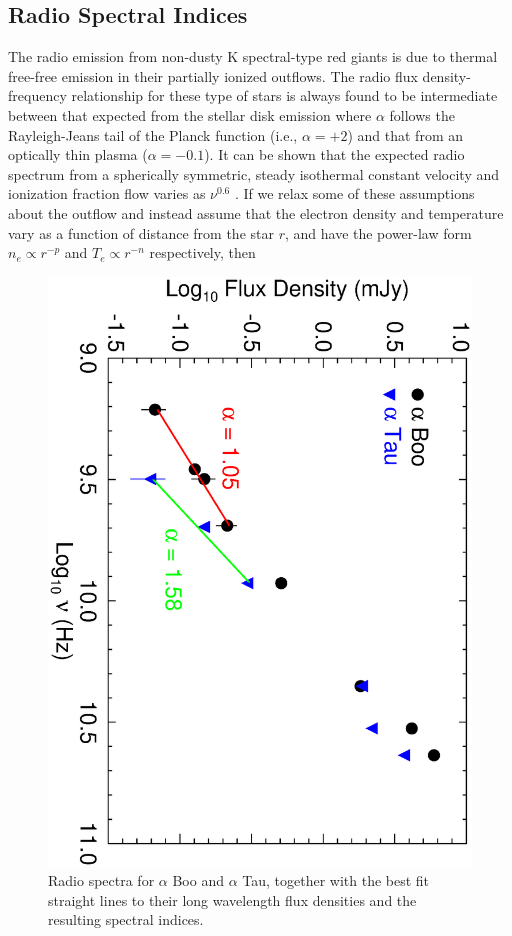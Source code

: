 \documentclass[iop]{emulateapj}
\begin{document}
\subsection{Radio Spectral Indices} \label{disc:disc3}
The radio emission from non-dusty K spectral-type red giants is due to thermal free-free emission in their partially ionized outflows. The radio flux density-frequency relationship for these type of stars is always found to be intermediate between that expected from the stellar disk emission where $\alpha$ follows the Rayleigh-Jeans tail of the Planck function (i.e., $\alpha = +2$) and that from an optically thin plasma ($\alpha = -0.1$). It can be shown that the expected radio spectrum from a spherically symmetric, steady isothermal constant velocity and ionization fraction flow varies as $\nu ^{0.6}$ \citep{1975MNRAS.170...41W,1975AA....39..217O,1975AA....39....1P}. If we relax some of these assumptions about the outflow and instead assume that the electron density and temperature vary as a function of distance from the star $r$, and have the power-law form $n_{e} \propto r^{-p}$ and $T_{e} \propto r^{-n}$ respectively, then 

\begin{figure}
\includegraphics[trim = 0mm 0mm 0mm 10mm, clip,scale=0.385,angle=90]{fig3.ps}
\caption{Radio spectra for $\alpha$ Boo and $\alpha$ Tau, together with the best fit straight lines to their long wavelength flux densities and the resulting spectral indices.}
\label{fig:fig3}
\end{figure}
\end{document}
